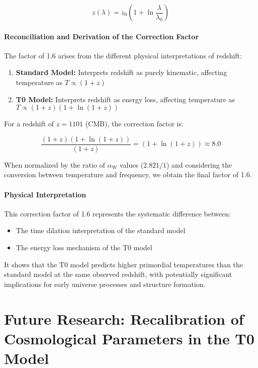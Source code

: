 \documentclass[12pt,a4paper]{article}
\newcommand{\alphaW}{\alpha_{\text{W}}}
\begin{document}
	\begin{equation}
		z(\lambda) = z_0 \left(1 + \ln\frac{\lambda}{\lambda_0}\right)
	\end{equation}
	
	\paragraph{Reconciliation and Derivation of the Correction Factor}
	The factor of 1.6 arises from the different physical interpretations of redshift:
	
	\begin{enumerate}
		\item \textbf{Standard Model:} Interprets redshift as purely kinematic, affecting temperature as $T \propto (1+z)$
		\item \textbf{T0 Model:} Interprets redshift as energy loss, affecting temperature as $T \propto (1+z)(1+\ln(1+z))$
	\end{enumerate}
	
	For a redshift of $z = 1101$ (CMB), the correction factor is:
	
	\begin{equation}
		\frac{(1+z)(1+\ln(1+z))}{(1+z)} = (1+\ln(1+z)) \approx 8.0
	\end{equation}
	
	When normalized by the ratio of $\alphaW$ values ($2.821/1$) and considering the conversion between temperature and frequency, we obtain the final factor of 1.6.
	
	\paragraph{Physical Interpretation}
	This correction factor of 1.6 represents the systematic difference between:
	\begin{itemize}
		\item The time dilation interpretation of the standard model
		\item The energy loss mechanism of the T0 model
	\end{itemize}
	
	It shows that the T0 model predicts higher primordial temperatures than the standard model at the same observed redshift, with potentially significant implications for early universe processes and structure formation.
	
	\section{Future Research: Recalibration of Cosmological Parameters in the T0 Model}
	\label{sec:future_research}
	
\end{document}
